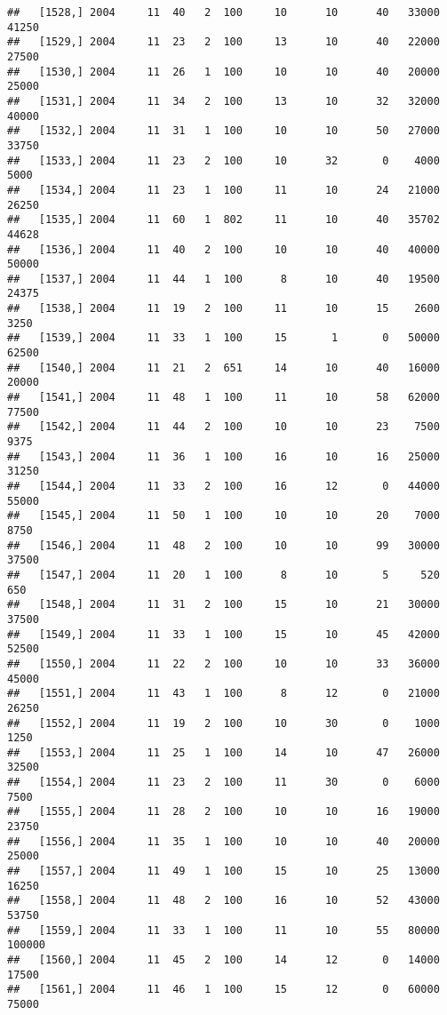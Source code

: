\documentclass{article}\usepackage[]{graphicx}\usepackage[]{color}
\makeatletter
\newenvironment{kframe}{%
 \def\at@end@of@kframe{}%
 \ifinner\ifhmode%
  \def\at@end@of@kframe{\end{minipage}}%
  \begin{minipage}{\columnwidth}%
 \fi\fi%
 \def\FrameCommand##1{\hskip\@totalleftmargin \hskip-\fboxsep
 \colorbox{shadecolor}{##1}\hskip-\fboxsep
     \hskip-\linewidth \hskip-\@totalleftmargin \hskip\columnwidth}%
 \MakeFramed {\advance\hsize-\width
   \@totalleftmargin\z@ \linewidth\hsize
   \@setminipage}}%
 {\par\unskip\endMakeFramed%
 \at@end@of@kframe}
\newenvironment{knitrout}{}{} %
\makeatother
\begin{document}
\begin{knitrout}
\begin{kframe}
\begin{verbatim}
##   [1528,] 2004     11  40   2  100     10      10      40   33000   41250
##   [1529,] 2004     11  23   2  100     13      10      40   22000   27500
##   [1530,] 2004     11  26   1  100     10      10      40   20000   25000
##   [1531,] 2004     11  34   2  100     13      10      32   32000   40000
##   [1532,] 2004     11  31   1  100     10      10      50   27000   33750
##   [1533,] 2004     11  23   2  100     10      32       0    4000    5000
##   [1534,] 2004     11  23   1  100     11      10      24   21000   26250
##   [1535,] 2004     11  60   1  802     11      10      40   35702   44628
##   [1536,] 2004     11  40   2  100     10      10      40   40000   50000
##   [1537,] 2004     11  44   1  100      8      10      40   19500   24375
##   [1538,] 2004     11  19   2  100     11      10      15    2600    3250
##   [1539,] 2004     11  33   1  100     15       1       0   50000   62500
##   [1540,] 2004     11  21   2  651     14      10      40   16000   20000
##   [1541,] 2004     11  48   1  100     11      10      58   62000   77500
##   [1542,] 2004     11  44   2  100     10      10      23    7500    9375
##   [1543,] 2004     11  36   1  100     16      10      16   25000   31250
##   [1544,] 2004     11  33   2  100     16      12       0   44000   55000
##   [1545,] 2004     11  50   1  100     10      10      20    7000    8750
##   [1546,] 2004     11  48   2  100     10      10      99   30000   37500
##   [1547,] 2004     11  20   1  100      8      10       5     520     650
##   [1548,] 2004     11  31   2  100     15      10      21   30000   37500
##   [1549,] 2004     11  33   1  100     15      10      45   42000   52500
##   [1550,] 2004     11  22   2  100     10      10      33   36000   45000
##   [1551,] 2004     11  43   1  100      8      12       0   21000   26250
##   [1552,] 2004     11  19   2  100     10      30       0    1000    1250
##   [1553,] 2004     11  25   1  100     14      10      47   26000   32500
##   [1554,] 2004     11  23   2  100     11      30       0    6000    7500
##   [1555,] 2004     11  28   2  100     10      10      16   19000   23750
##   [1556,] 2004     11  35   1  100     10      10      40   20000   25000
##   [1557,] 2004     11  49   1  100     15      10      25   13000   16250
##   [1558,] 2004     11  48   2  100     16      10      52   43000   53750
##   [1559,] 2004     11  33   1  100     11      10      55   80000  100000
##   [1560,] 2004     11  45   2  100     14      12       0   14000   17500
##   [1561,] 2004     11  46   1  100     15      12       0   60000   75000

\end{verbatim}
\end{kframe}
\end{knitrout}
\end{document}
